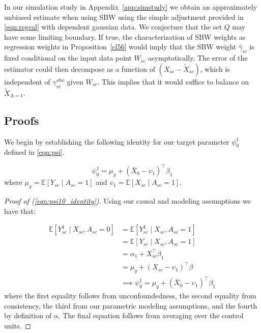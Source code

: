 \begin{remark}\label{remark:sbwspeculation}
    In our simulation study in Appendix~\ref{app:simstudy} we obtain an approximately unbiased estimate when using SBW using the simple adjustment provided in \eqref{eqn:regcal} with dependent gaussian data. We conjecture that the set $Q$ may have some limiting boundary. If true, the characterization of SBW weights as regression weights in Proposition~\ref{cl56} would imply that the SBW weight $\hat{\gamma}_{sc}$ is fixed conditional on the input data point $W_{sc}$ asymptotically. The error of the estimator could then decompose as a function of $(X_{sc} - \tilde{X}_{sc})$, which is independent of $\gamma_{sc}^{sbw}$ given $W_{sc}$. This implies that it would suffice to balance on $\tilde{X}_{A=1}$.
\end{remark}

\subsection{Proofs}\label{app:AsecIII}

We begin by establishing the following identity for our target parameter $\psi_0^1$ defined in \eqref{eqn:psi}.

\begin{equation}\label{eqn:psi10_identity}
\psi^1_0 = \mu_y + (\bar{X}_0 - \upsilon_1)^\top\beta_1
\end{equation}
%
where $\mu_y = \mathbb{E}[Y_{sc} \mid A_{sc} = 1]$ and $\upsilon_1 = \mathbb{E}[X_{sc} \mid A_{sc} = 1]$.

\begin{proof}[Proof of (\ref{eqn:psi10_identity})]
Using our causal and modeling assumptions we have that:

\begin{align*}
\mathbb{E}[Y_{sc}^1 \mid X_{sc}, A_{sc} = 0] &= \mathbb{E}[Y_{sc}^1 \mid X_{sc}, A_{sc} = 1] \\
&= \mathbb{E}[Y_{sc} \mid X_{sc}, A_{sc} = 1] \\
&= \alpha_1 + X_{sc}^\top\beta_1 \\
&= \mu_y + (X_{sc} - \upsilon_1)^\top\beta \\
&\implies \psi_0^1 = \mu_y + (\bar{X}_0 - \upsilon_1)^\top\beta_1
\end{align*}
%
where the first equality follows from unconfoundedness, the second equality from consistency, the third from our parametric modeling assumptions, and the fourth by definition of $\alpha$. The final equation follows from averaging over the control units.
\end{proof}
%

